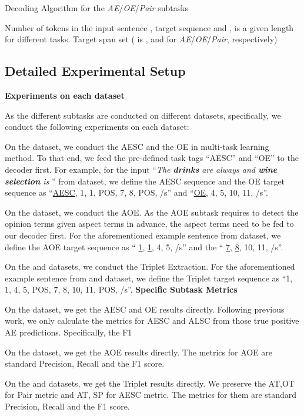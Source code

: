 \documentclass[11pt,a4paper]{article}
\begin{document}
\begin{algorithm}[!h]
    \begin{algorithmic}[1]
      \caption{Decoding Algorithm for the \emph{AE}/\emph{OE}/\emph{Pair} subtasks} \label{al3}
      \Require Number of tokens in the input sentence , target sequence  and ,  is a given length for different tasks.
      \Ensure  Target span set ( is ,  and  for \emph{AE}/\emph{OE}/\emph{Pair}, respectively)
      \State  
      \While{}
        \State 
        \If{}
        \State  
        \State 
        \EndIf
        \State 
        \State 
      \EndWhile
      \State \Return{}
    \end{algorithmic}  
\end{algorithm}




\subsection{Detailed Experimental Setup}
\textbf{Experiments on each dataset}

As the different subtasks are conducted on different datasets, specifically, we conduct the following experiments on each dataset:

  On the \emph{} dataset, we conduct the AESC and the OE  in multi-task learning method. To that end, we feed the pre-defined task tags ``AESC'' and ``OE'' to the decoder first. For example, for the input ``\emph{The \textbf{drinks} are always  and \textbf{wine selection} is }'' from \emph{} dataset, we define the AESC sequence and the OE target sequence as  ``\underline{AESC}, 1, 1, POS, 7, 8, POS, /s'' and ``\underline{OE}, 4, 5, 10, 11, /s''.

  On the \emph{} dataset, we conduct the AOE. As the AOE subtask requires to detect the opinion terms given aspect  terms in advance, the aspect terms need to be fed to our decoder first. For the aforementioned example sentence from \emph{} dataset, we define the AOE target sequence as `` \underline{1}, \underline{1}, 4, 5, /s'' and the `` \underline{7}, \underline{8}, 10, 11, /s''.

 On the \emph{} and \emph{} datasets, we conduct the Triplet Extraction. For the aforementioned example sentence from \emph{} and \emph{} dataset, we define the Triplet target sequence as ``1, 1, 4, 5, POS, 7, 8, 10, 11, POS, /s''.\newline
\textbf{Specific Subtask Metrics}

 On the \emph{} dataset, we get the AESC and OE results directly. Following previous work, we only calculate the metrics for AESC and ALSC from those true positive AE predictions.  Specifically, the F1 

 On the \emph{} dataset, we get the AOE results directly. The metrics for AOE are standard Precision, Recall and the F1 score.

 On the \emph{} and \emph{} datasets, we get the Triplet results directly.  We preserve the AT,OT for Pair metric and AT, SP for AESC metric. The metrics for them are standard Precision, Recall and the F1 score.
\end{document}
